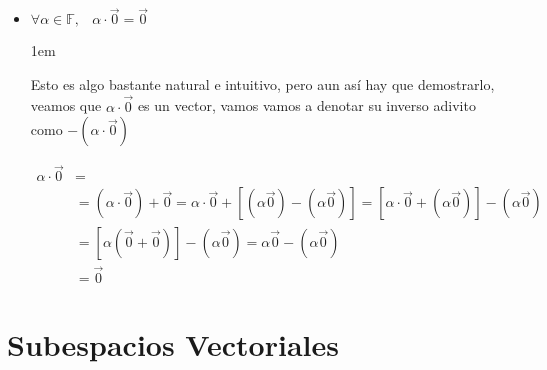 \documentclass[12pt]{report}                                    %
\newenvironment{SmallIndentation}[1][0.75em]                    %
    {\begin{adjustwidth}{#1}{}\begin{footnotesize}}                 %
    {\end{footnotesize}\end{adjustwidth}}                           %
\DeclareMathOperator \Space {\quad}                             %
\DeclareMathOperator \MiniSpace {\;}                            %
\begin{document}
\begin{itemize}
\begin{SmallIndentation}[1em]
                    \end{SmallIndentation}


                \item $\forall \alpha \in \mathbb{F}, \MiniSpace \alpha \cdot \vec{0} = \vec{0}$

                    \begin{SmallIndentation}[1em]
                        Esto es algo bastante natural e intuitivo, pero aun así hay que demostrarlo, 
                        veamos que $\alpha \cdot \vec{0}$ es un vector, vamos vamos a denotar su inverso
                        adivito como $- (\alpha \cdot \vec{0})$

                        \begin{equation*}
                        \begin{split}
                            \alpha \cdot \vec{0} &=                                                           \\
                                            &= (\alpha \cdot \vec{0}) + \vec{0} 
                                             = \alpha \cdot \vec{0} + [ (\alpha \vec{0}) - (\alpha \vec{0}) ]
                                             = [\alpha \cdot \vec{0} +  (\alpha \vec{0})] - (\alpha \vec{0})  \\
                                            &= [\alpha (\vec{0} + \vec{0})] - (\alpha \vec{0})                 
                                             = \alpha \vec{0} - (\alpha \vec{0})                              \\
                                            &= \vec{0}
                        \end{split}
                        \end{equation*}

                    \end{SmallIndentation}

            \end{itemize}


    \chapter{Subespacios Vectoriales}
\end{document}

